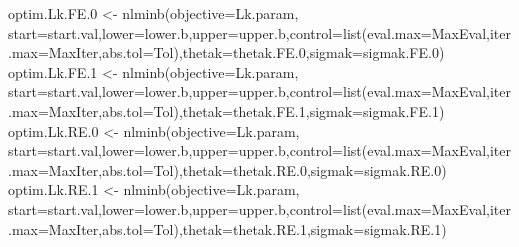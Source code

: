 \documentclass[
]{book}
\newenvironment{Shaded}{\begin{snugshade}}{\end{snugshade}}
\newcommand{\AttributeTok}[1]{\textcolor[rgb]{0.77,0.63,0.00}{#1}}
\newcommand{\FloatTok}[1]{\textcolor[rgb]{0.00,0.00,0.81}{#1}}
\newcommand{\FunctionTok}[1]{\textcolor[rgb]{0.00,0.00,0.00}{#1}}
\newcommand{\NormalTok}[1]{#1}
\newcommand{\OtherTok}[1]{\textcolor[rgb]{0.56,0.35,0.01}{#1}}
\theoremstyle{definition}
\theoremstyle{definition}
\theoremstyle{definition}
\theoremstyle{definition}
\theoremstyle{remark}
\begin{document}
\begin{Shaded}
\begin{Highlighting}[]
\NormalTok{optim.Lk.FE}\FloatTok{.0} \OtherTok{\textless{}{-}} \FunctionTok{nlminb}\NormalTok{(}\AttributeTok{objective=}\NormalTok{Lk.param, }\AttributeTok{start=}\NormalTok{start.val,}\AttributeTok{lower=}\NormalTok{lower.b,}\AttributeTok{upper=}\NormalTok{upper.b,}\AttributeTok{control=}\FunctionTok{list}\NormalTok{(}\AttributeTok{eval.max=}\NormalTok{MaxEval,}\AttributeTok{iter.max=}\NormalTok{MaxIter,}\AttributeTok{abs.tol=}\NormalTok{Tol),}\AttributeTok{thetak=}\NormalTok{thetak.FE}\FloatTok{.0}\NormalTok{,}\AttributeTok{sigmak=}\NormalTok{sigmak.FE}\FloatTok{.0}\NormalTok{)}
\NormalTok{optim.Lk.FE}\FloatTok{.1} \OtherTok{\textless{}{-}} \FunctionTok{nlminb}\NormalTok{(}\AttributeTok{objective=}\NormalTok{Lk.param, }\AttributeTok{start=}\NormalTok{start.val,}\AttributeTok{lower=}\NormalTok{lower.b,}\AttributeTok{upper=}\NormalTok{upper.b,}\AttributeTok{control=}\FunctionTok{list}\NormalTok{(}\AttributeTok{eval.max=}\NormalTok{MaxEval,}\AttributeTok{iter.max=}\NormalTok{MaxIter,}\AttributeTok{abs.tol=}\NormalTok{Tol),}\AttributeTok{thetak=}\NormalTok{thetak.FE}\FloatTok{.1}\NormalTok{,}\AttributeTok{sigmak=}\NormalTok{sigmak.FE}\FloatTok{.1}\NormalTok{)}
\NormalTok{optim.Lk.RE}\FloatTok{.0} \OtherTok{\textless{}{-}} \FunctionTok{nlminb}\NormalTok{(}\AttributeTok{objective=}\NormalTok{Lk.param, }\AttributeTok{start=}\NormalTok{start.val,}\AttributeTok{lower=}\NormalTok{lower.b,}\AttributeTok{upper=}\NormalTok{upper.b,}\AttributeTok{control=}\FunctionTok{list}\NormalTok{(}\AttributeTok{eval.max=}\NormalTok{MaxEval,}\AttributeTok{iter.max=}\NormalTok{MaxIter,}\AttributeTok{abs.tol=}\NormalTok{Tol),}\AttributeTok{thetak=}\NormalTok{thetak.RE}\FloatTok{.0}\NormalTok{,}\AttributeTok{sigmak=}\NormalTok{sigmak.RE}\FloatTok{.0}\NormalTok{)}
\NormalTok{optim.Lk.RE}\FloatTok{.1} \OtherTok{\textless{}{-}} \FunctionTok{nlminb}\NormalTok{(}\AttributeTok{objective=}\NormalTok{Lk.param, }\AttributeTok{start=}\NormalTok{start.val,}\AttributeTok{lower=}\NormalTok{lower.b,}\AttributeTok{upper=}\NormalTok{upper.b,}\AttributeTok{control=}\FunctionTok{list}\NormalTok{(}\AttributeTok{eval.max=}\NormalTok{MaxEval,}\AttributeTok{iter.max=}\NormalTok{MaxIter,}\AttributeTok{abs.tol=}\NormalTok{Tol),}\AttributeTok{thetak=}\NormalTok{thetak.RE}\FloatTok{.1}\NormalTok{,}\AttributeTok{sigmak=}\NormalTok{sigmak.RE}\FloatTok{.1}\NormalTok{)}
\end{Highlighting}
\end{Shaded}
\end{document}
